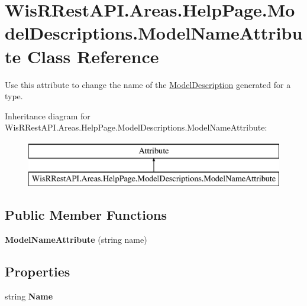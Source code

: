 \hypertarget{class_wis_r_rest_a_p_i_1_1_areas_1_1_help_page_1_1_model_descriptions_1_1_model_name_attribute}{}\section{Wis\+R\+Rest\+A\+P\+I.\+Areas.\+Help\+Page.\+Model\+Descriptions.\+Model\+Name\+Attribute Class Reference}
\label{class_wis_r_rest_a_p_i_1_1_areas_1_1_help_page_1_1_model_descriptions_1_1_model_name_attribute}


Use this attribute to change the name of the \hyperlink{class_wis_r_rest_a_p_i_1_1_areas_1_1_help_page_1_1_model_descriptions_1_1_model_description}{Model\+Description} generated for a type.  


Inheritance diagram for Wis\+R\+Rest\+A\+P\+I.\+Areas.\+Help\+Page.\+Model\+Descriptions.\+Model\+Name\+Attribute\+:\begin{figure}[H]
\begin{center}
\leavevmode
\includegraphics[height=2.000000cm]{class_wis_r_rest_a_p_i_1_1_areas_1_1_help_page_1_1_model_descriptions_1_1_model_name_attribute}
\end{center}
\end{figure}
\subsection*{Public Member Functions}
\begin{DoxyCompactItemize}
\item 
\hypertarget{class_wis_r_rest_a_p_i_1_1_areas_1_1_help_page_1_1_model_descriptions_1_1_model_name_attribute_a070f55838934a1d1a1e356651bf2e8a0}{}{\bfseries Model\+Name\+Attribute} (string name)\label{class_wis_r_rest_a_p_i_1_1_areas_1_1_help_page_1_1_model_descriptions_1_1_model_name_attribute_a070f55838934a1d1a1e356651bf2e8a0}

\end{DoxyCompactItemize}
\subsection*{Properties}
\begin{DoxyCompactItemize}
\item 
\hypertarget{class_wis_r_rest_a_p_i_1_1_areas_1_1_help_page_1_1_model_descriptions_1_1_model_name_attribute_ab636d88c2586310c15c9382d6570be97}{}string {\bfseries Name}\label{class_wis_r_rest_a_p_i_1_1_areas_1_1_help_page_1_1_model_descriptions_1_1_model_name_attribute_ab636d88c2586310c15c9382d6570be97}

\end{DoxyCompactItemize}


